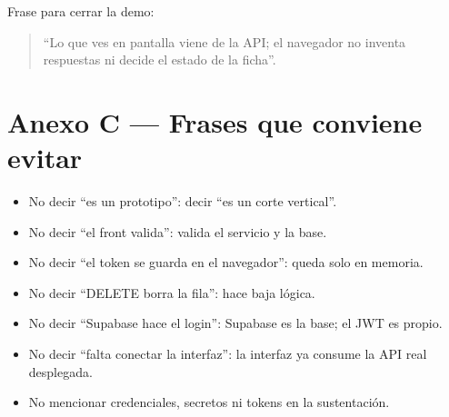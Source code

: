 \documentclass[11pt,a4paper]{article}
\begin{document}
Frase para cerrar la demo:

\begin{quote}
  ``Lo que ves en pantalla viene de la API; el navegador no inventa respuestas
  ni decide el estado de la ficha''.
\end{quote}

\section{Anexo C --- Frases que conviene evitar}

\begin{itemize}[leftmargin=*]
  \item No decir ``es un prototipo'': decir ``es un corte vertical''.
  \item No decir ``el front valida'': valida el servicio y la base.
  \item No decir ``el token se guarda en el navegador'': queda solo en memoria.
  \item No decir ``DELETE borra la fila'': hace baja lógica.
  \item No decir ``Supabase hace el login'': Supabase es la base; el JWT es
    propio.
  \item No decir ``falta conectar la interfaz'': la interfaz ya consume la API
    real desplegada.
  \item No mencionar credenciales, secretos ni tokens en la sustentación.
\end{itemize}
\end{document}
